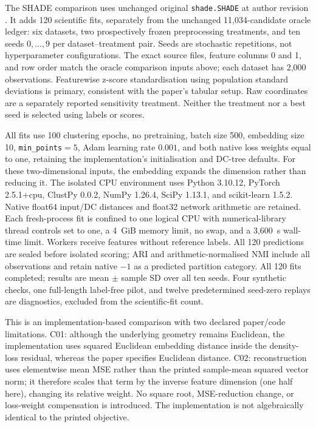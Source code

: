 \documentclass[pdflatex,sn-basic,Numbered]{sn-jnl}
\begin{document}
The SHADE comparison uses unchanged original \texttt{shade.SHADE} at author
revision \texttt{}
\citep{BeerEtAl2024SHADE}. It adds 120 scientific fits, separately from the
unchanged 11,034-candidate oracle ledger: six datasets, two prospectively frozen
preprocessing treatments, and ten seeds $0,\ldots,9$ per dataset--treatment
pair. Seeds are stochastic repetitions, not hyperparameter configurations.
The exact source files, feature columns 0 and 1, and row order match the
oracle comparison inputs above; each dataset has 2,000 observations.
Featurewise z-score standardisation using population standard deviations is
primary, consistent with the paper's tabular setup. Raw coordinates are a
separately reported sensitivity treatment. Neither the treatment nor a best
seed is selected using labels or scores.

All fits use 100 clustering epochs, no pretraining, batch size 500, embedding
size 10, \texttt{min\_points}$=5$, Adam learning rate $0.001$, and both native
loss weights equal to one, retaining the implementation's initialisation and
DC-tree defaults. For these two-dimensional inputs, the embedding expands
the dimension rather than reducing it. The isolated CPU environment uses
Python 3.10.12, PyTorch 2.5.1+cpu, ClustPy 0.0.2, NumPy 1.26.4, SciPy 1.13.1,
and scikit-learn 1.5.2. Native float64 input/DC distances and float32 network
arithmetic are retained. Each fresh-process fit is confined to one logical
CPU with numerical-library thread controls set to one, a 4~GiB memory limit,
no swap, and a 3,600~s wall-time limit. Workers receive features without
reference labels. All 120 predictions are sealed before isolated scoring;
ARI and arithmetic-normalised NMI include all observations and retain native
$-1$ as a predicted partition category. All 120 fits completed; results are
mean $\pm$ sample SD over all ten seeds. Four synthetic checks, one full-length
label-free pilot, and twelve predetermined seed-zero replays are diagnostics,
excluded from the scientific-fit count.

This is an implementation-based comparison with two declared paper/code
limitations. C01: although the underlying geometry remains Euclidean, the
implementation uses squared Euclidean embedding distance inside the
density-loss residual, whereas the paper specifies Euclidean distance.
C02: reconstruction uses elementwise mean MSE rather than the printed
sample-mean squared vector norm; it therefore scales that term by the inverse
feature dimension (one half here), changing its relative weight. No square
root, MSE-reduction change, or loss-weight compensation is introduced. The
implementation is not algebraically identical to the printed objective.
\end{document}
